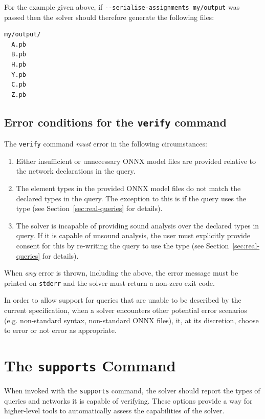 For the example given above, if \texttt{-{}-serialise-assignments my/output} was passed then the solver should therefore generate the following files:
\begin{lstlisting}[style=bash]
my/output/
  A.pb
  B.pb
  H.pb
  Y.pb
  C.pb
  Z.pb
\end{lstlisting}

\subsection{Error conditions for the \texttt{verify} command}
\label{sec:verify-command-errors}
The \texttt{verify} command \textit{must} error in the following circumstances:
\begin{enumerate}
\item Either insufficient or unnecessary ONNX model files are provided relative to the network declarations in the \vnnlib{} query.
\item The element types in the provided ONNX model files do not match the declared types in the \vnnlib{} query. The exception to this is if the query uses the  type (see Section~\ref{sec:real-queries} for details).
\item The solver is incapable of providing sound analysis over the declared types in \vnnlib{} query. If it is capable of unsound analysis, the user must explicitly provide consent for this by re-writing the query to use the  type (see Section~\ref{sec:real-queries} for details).
\end{enumerate}
When \textit{any} error is thrown, including the above, the error message must be printed on \texttt{stderr} and the solver must return a non-zero exit code.

In order to allow support for queries that are unable to be described by the current \vnnlib{} specification, when a solver encounters other potential error scenarios (e.g. non-standard \vnnlib{} syntax, non-standard ONNX files), it, at its discretion, choose to error or not error as appropriate.

\section{The \texttt{supports} Command}
\label{sec:global_capabilities}

When invoked with the \texttt{supports} command, the solver should report the types of queries and networks it is capable of verifying.
These options provide a way for higher-level tools to automatically assess the capabilities of the solver.

